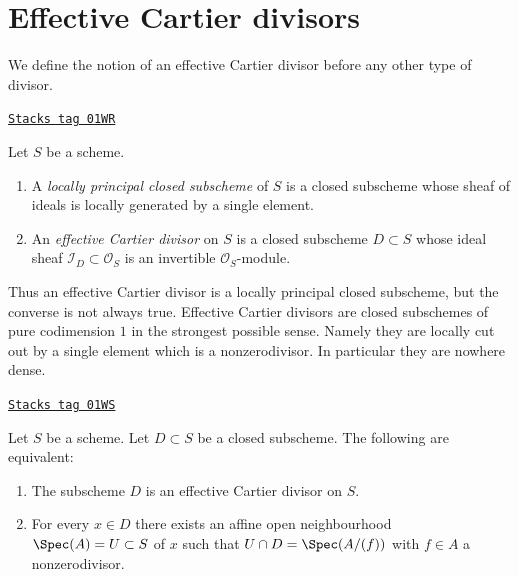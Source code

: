 \section{Effective Cartier divisors}
\label{divisors-section-effective-Cartier-divisors}
We define the notion of an effective Cartier divisor before any other type
of divisor.

\begin{definition}
\label{divisors-definition-effective-Cartier-divisor}
\href{https://stacks.math.columbia.edu/tag/01WR}{\texttt{Stacks tag 01WR}}

Let $S$ be a scheme.
\begin{enumerate}
\item A {\it locally principal closed subscheme} of $S$ is a closed subscheme
whose sheaf of ideals is locally generated by a single element.
\item An {\it effective Cartier divisor} on $S$ is a closed subscheme
$D \subset S$ whose ideal sheaf $\mathcal{I}_D \subset \mathcal{O}_S$
is an invertible $\mathcal{O}_S$-module.
\end{enumerate}
\end{definition}

Thus an effective Cartier divisor is a locally principal closed subscheme,
but the converse is not always true. Effective Cartier divisors are closed
subschemes of pure codimension $1$ in the strongest possible sense. Namely
they are locally cut out by a single element which is a nonzerodivisor.
In particular they are nowhere dense.

\begin{lemma}
\label{divisors-lemma-characterize-effective-Cartier-divisor}
\href{https://stacks.math.columbia.edu/tag/01WS}{\texttt{Stacks tag 01WS}}

Let $S$ be a scheme.
Let $D \subset S$ be a closed subscheme.
The following are equivalent:
\begin{enumerate}
\item The subscheme $D$ is an effective Cartier divisor on $S$.
\item For every $x \in D$ there exists an affine open neighbourhood
$\Spec(A) = U \subset S$ of $x$ such that
$U \cap D = \Spec(A/(f))$ with $f \in A$ a nonzerodivisor.
\end{enumerate}
\end{lemma}

